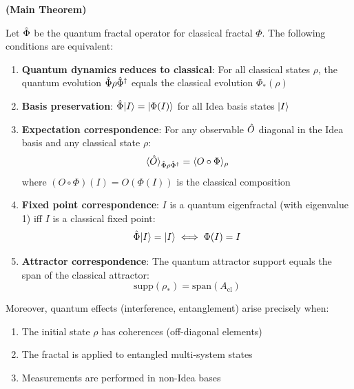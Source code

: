 \begin{theorem}
\label{thm:qc-correspondence}
\textbf{(Main Theorem)}

Let $\hat{\Phi}$ be the quantum fractal operator for classical fractal $\Phi$. The following conditions are equivalent:
\begin{enumerate}
  \item \textbf{Quantum dynamics reduces to classical}: For all classical states $\rho$, the quantum evolution $\hat{\Phi}\rho\hat{\Phi}^\dagger$ equals the classical evolution $\Phi_*(\rho)$

  \item \textbf{Basis preservation}: $\hat{\Phi}|I\rangle = |\Phi(I)\rangle$ for all Idea basis states $|I\rangle$

  \item \textbf{Expectation correspondence}: For any observable $\hat{O}$ diagonal in the Idea basis and any classical state $\rho$:
  \[
  \langle \hat{O} \rangle_{\hat{\Phi}\rho\hat{\Phi}^\dagger} = \langle O \circ \Phi \rangle_\rho
  \]
  where $(O \circ \Phi)(I) = O(\Phi(I))$ is the classical composition

  \item \textbf{Fixed point correspondence}: $I$ is a quantum eigenfractal (with eigenvalue 1) iff $I$ is a classical fixed point:
  \[
  \hat{\Phi}|I\rangle = |I\rangle \iff \Phi(I) = I
  \]

  \item \textbf{Attractor correspondence}: The quantum attractor support equals the span of the classical attractor:
  \[
  \mathrm{supp}(\rho_*) = \mathrm{span}(A_{\mathrm{cl}})
  \]
\end{enumerate}

Moreover, quantum effects (interference, entanglement) arise precisely when:
\begin{enumerate}
  \item[(Q1)] The initial state $\rho$ has coherences (off-diagonal elements)
  \item[(Q2)] The fractal is applied to entangled multi-system states
  \item[(Q3)] Measurements are performed in non-Idea bases
\end{enumerate}
\end{theorem}

